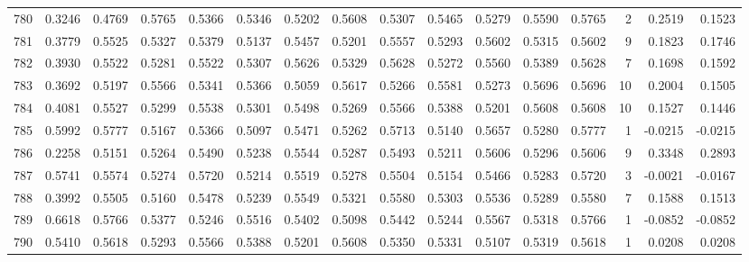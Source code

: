 \begin{tabular}{lrrrrrrrrrrrrrrr}
780 &      0.3246 &  0.4769 &  0.5765 &  0.5366 &  0.5346 &  0.5202 &  0.5608 &  0.5307 &  0.5465 &  0.5279 &   0.5590 &     0.5765 &      2 &                    0.2519 &                     0.1523 \\
781 &      0.3779 &  0.5525 &  0.5327 &  0.5379 &  0.5137 &  0.5457 &  0.5201 &  0.5557 &  0.5293 &  0.5602 &   0.5315 &     0.5602 &      9 &                    0.1823 &                     0.1746 \\
782 &      0.3930 &  0.5522 &  0.5281 &  0.5522 &  0.5307 &  0.5626 &  0.5329 &  0.5628 &  0.5272 &  0.5560 &   0.5389 &     0.5628 &      7 &                    0.1698 &                     0.1592 \\
783 &      0.3692 &  0.5197 &  0.5566 &  0.5341 &  0.5366 &  0.5059 &  0.5617 &  0.5266 &  0.5581 &  0.5273 &   0.5696 &     0.5696 &     10 &                    0.2004 &                     0.1505 \\
784 &      0.4081 &  0.5527 &  0.5299 &  0.5538 &  0.5301 &  0.5498 &  0.5269 &  0.5566 &  0.5388 &  0.5201 &   0.5608 &     0.5608 &     10 &                    0.1527 &                     0.1446 \\
785 &      0.5992 &  0.5777 &  0.5167 &  0.5366 &  0.5097 &  0.5471 &  0.5262 &  0.5713 &  0.5140 &  0.5657 &   0.5280 &     0.5777 &      1 &                   -0.0215 &                    -0.0215 \\
786 &      0.2258 &  0.5151 &  0.5264 &  0.5490 &  0.5238 &  0.5544 &  0.5287 &  0.5493 &  0.5211 &  0.5606 &   0.5296 &     0.5606 &      9 &                    0.3348 &                     0.2893 \\
787 &      0.5741 &  0.5574 &  0.5274 &  0.5720 &  0.5214 &  0.5519 &  0.5278 &  0.5504 &  0.5154 &  0.5466 &   0.5283 &     0.5720 &      3 &                   -0.0021 &                    -0.0167 \\
788 &      0.3992 &  0.5505 &  0.5160 &  0.5478 &  0.5239 &  0.5549 &  0.5321 &  0.5580 &  0.5303 &  0.5536 &   0.5289 &     0.5580 &      7 &                    0.1588 &                     0.1513 \\
789 &      0.6618 &  0.5766 &  0.5377 &  0.5246 &  0.5516 &  0.5402 &  0.5098 &  0.5442 &  0.5244 &  0.5567 &   0.5318 &     0.5766 &      1 &                   -0.0852 &                    -0.0852 \\
790 &      0.5410 &  0.5618 &  0.5293 &  0.5566 &  0.5388 &  0.5201 &  0.5608 &  0.5350 &  0.5331 &  0.5107 &   0.5319 &     0.5618 &      1 &                    0.0208 &                     0.0208 \\

\end{tabular}
